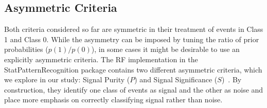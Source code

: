\documentclass[prd, twocolumn, lengthcheck, superscriptaddress, showpacs, letterpaper, nofootinbib]{revtex4-1}
\newcommand\auxvec{x}
\newcommand\Ft{\ensuremath{F^\ast}}
\newcommand\auxvect{\auxvec^{\ast}}
\begin{document}

\subsection{Asymmetric Criteria}
Both criteria considered so far are symmetric in their treatment of events in Class 1 and Class 0. While the asymmetry can be imposed by tuning the ratio of prior probabilities ($p(1)/p(0)$), in some cases it might be desirable to use an explicitly asymmetric criteria. The \ac{RF} implementation in the StatPatternRecognition package contains two different asymmetric criteria, which we explore in our study: Signal Purity ($P$) and Signal Significance ($S$)~\cite{StatPatternRecognitionPackage}. By construction, they identify one class of events as signal and the other as noise and place more emphasis on correctly classifying signal rather than noise. 
\end{document}
